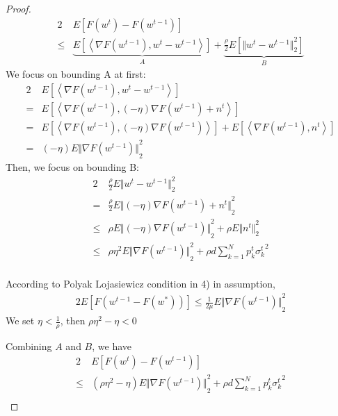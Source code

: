 \documentclass[conference]{IEEEtran}
\newtheorem{proof}{Proof}
\begin{document}
\begin{proof}
    \begin{alignat}{2}
             & E[F(w^t)-F(w^{t-1})] \\
        \leq & \underbrace{E[\left\langle \nabla F(w^{t-1}), w^t - w^{t-1}\right\rangle]}_A + \underbrace{\frac{\rho}{2}E[{\Vert w^t - w^{t-1} \Vert}_2^2]}_B
    \end{alignat}
    We focus on bounding A at first:
    \begin{alignat}{2}
            & E[\left\langle \nabla F(w^{t-1}), w^t - w^{t-1}\right\rangle] \\
        =   & E[\left\langle \nabla F(w^{t-1}), (-\eta)\nabla F(w^{t-1}) + n^t\right\rangle] \\
        =   & E[\left\langle \nabla F(w^{t-1}), (-\eta)\nabla F(w^{t-1}) \right\rangle] + E[\left\langle\nabla F(w^{t-1}), n^t\right\rangle] \\
        =   & (-\eta)E{\Vert\nabla F(w^{t-1})\Vert}_2^2
    \end{alignat}
    Then, we focus on bounding B:
    \begin{alignat}{2}
            & \frac{\rho}{2} E {\Vert w^t - w^{t-1} \Vert}_2^2 \\
        =   & \frac{\rho}{2} E {\Vert (-\eta) \nabla F(w^{t-1}) + n^t\Vert}_2^2 \\
        \leq& \rho E{\Vert(-\eta)\nabla F(w^{t-1})\Vert}_2^2 + \rho E{\Vert n^t \Vert}_2^2 \\
        \leq& \rho \eta^2 E{\Vert \nabla F(w^{t-1})\Vert}_2^2 + \rho d \sum_{k=1}^{N} p_k^t {\sigma_k^t}^2 \\
    \end{alignat}

    According to Polyak Lojasiewicz condition in 4) in assumption,
    \begin{alignat}{2}
        E[F(w^{t-1}-F(w^*))] \leq \frac{1}{2\mu}E{\Vert\nabla F(w^{t-1})\Vert}_2^2
    \end{alignat}
    We set $\eta < \frac{1}{\rho}$, then $\rho\eta^2 - \eta < 0$

    Combining $A$ and $B$, we have
    \begin{alignat}{2}
            & E[F(w^t) - F(w^{t-1})] \\
        \leq& (\rho \eta^2 - \eta) E{\Vert\nabla F(w^{t-1})\Vert}_2^2 + \rho d \sum_{k=1}^{N} p_k^t {\sigma_k^t}^2 \\
    \end{alignat}
    
\end{proof}
\end{document}
